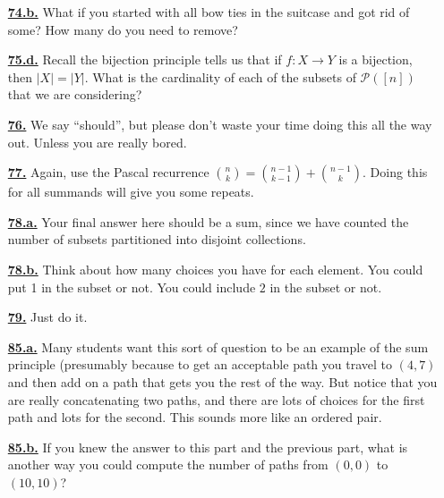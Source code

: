 \documentclass[10pt,]{book}
\theoremstyle{plain}
\theoremstyle{definition}
\theoremstyle{definition}
\theoremstyle{definition}
\numberwithin{equation}{chapter}
\def\pow{\mathcal P}
\newcommand{\card}[1]{\left| #1 \right|}
\begin{document}
\begin{itemize}[itemsep=1em]
\hypertarget{a-74.b}{}\item[\textbf{\hyperref[task-103]{74.b.}}]
\hypertarget{p-561}{}%
What if you started with all bow ties in the suitcase and got rid of some?  How many do you need to remove?%

\hypertarget{a-75.d}{}\item[\textbf{\hyperref[task-108]{75.d.}}]
\hypertarget{p-569}{}%
Recall the bijection principle tells us that if \(f:X \to Y\) is a bijection, then \(\card{X} = \card{Y}\).  What is the cardinality of each of the subsets of \(\pow([n])\) that we are considering?%

\hypertarget{a-76}{}\item[\textbf{\hyperref[act-pascalrowsum-alg]{76.}}]
\hypertarget{p-575}{}%
We say ``should'', but please don't waste your time doing this all the way out.  Unless you are really bored.%

\hypertarget{a-77}{}\item[\textbf{\hyperref[activity-70]{77.}}]
\hypertarget{p-577}{}%
Again, use the Pascal recurrence \(\binom{n}{k} = \binom{n-1}{k-1} + \binom{n-1}{k}\).  Doing this for all summands will give you some repeats.%

\hypertarget{a-78.a}{}\item[\textbf{\hyperref[task-109]{78.a.}}]
\hypertarget{p-581}{}%
Your final answer here should be a sum, since we have counted the number of subsets partitioned into disjoint collections.%

\hypertarget{a-78.b}{}\item[\textbf{\hyperref[task-110]{78.b.}}]
\hypertarget{p-583}{}%
Think about how many choices you have for each element.  You could put 1 in the subset or not.  You could include \(2\) in the subset or not.%

\hypertarget{a-79}{}\item[\textbf{\hyperref[act-pascalrowsum-binom]{79.}}]
\hypertarget{p-588}{}%
Just do it.%

\hypertarget{a-85.a}{}\item[\textbf{\hyperref[task-127]{85.a.}}]
\hypertarget{p-626}{}%
Many students want this sort of question to be an example of the sum principle (presumably because to get an acceptable path you travel to \((4,7)\) and then add on a path that gets you the rest of the way.  But notice that you are really concatenating two paths, and there are lots of choices for the first path and lots for the second.  This sounds more like an ordered pair.%

\hypertarget{a-85.b}{}\item[\textbf{\hyperref[task-128]{85.b.}}]
\hypertarget{p-628}{}%
If you knew the answer to this part and the previous part, what is another way you could compute the number of paths from \((0,0)\) to \((10,10)\)?%


\end{itemize}
\end{document}
